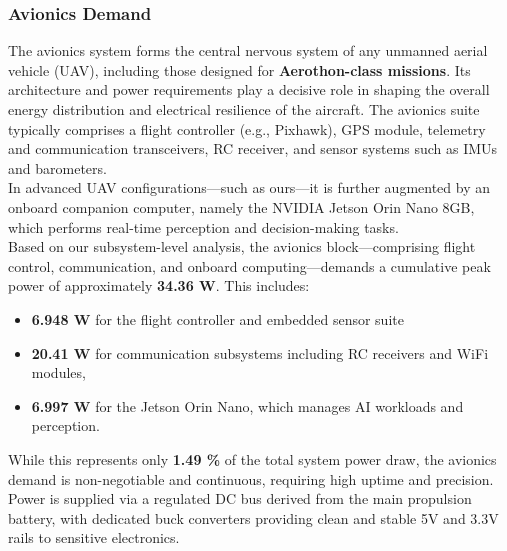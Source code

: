 \documentclass[12pt]{report}
\begin{document}
        \subsubsection{Avionics Demand}
        The avionics system forms the central nervous system of any unmanned aerial vehicle (UAV), including those designed for \textbf{Aerothon-class missions}. Its architecture and power requirements play a decisive role in shaping the overall energy distribution and electrical resilience of the aircraft. The avionics suite typically comprises a flight controller (e.g., Pixhawk), GPS module, telemetry and communication transceivers, RC receiver, and sensor systems such as IMUs and barometers. \\ 

        In advanced UAV configurations—such as ours—it is further augmented by an onboard companion computer, namely the NVIDIA Jetson Orin Nano 8GB, which performs real-time perception and decision-making tasks. \\ 

        Based on our subsystem-level analysis, the avionics block—comprising flight control, communication, and onboard computing—demands a cumulative peak power of approximately \textbf{34.36 W}. This includes:
        \begin{itemize}
          \item \textbf{6.948 W} for the flight controller and embedded sensor suite
          \item \textbf{20.41 W} for communication subsystems including RC receivers and WiFi modules,
          \item \textbf{6.997 W} for the Jetson Orin Nano, which manages AI workloads and perception.
        \end{itemize}
        While this represents only \textbf{1.49 \%} of the total system power draw, the avionics demand is non-negotiable and continuous, requiring high uptime and precision. Power is supplied via a regulated DC bus derived from the main propulsion battery, with dedicated buck converters providing clean and stable 5V and 3.3V rails to sensitive electronics.
\end{document}
